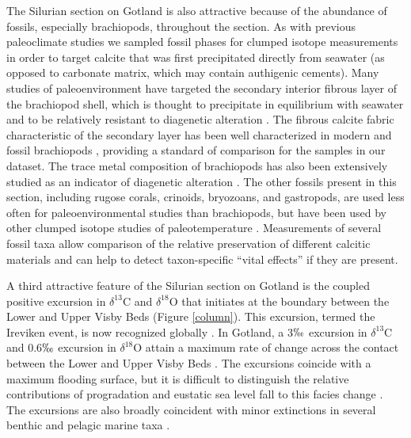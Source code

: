 \documentclass[5p, authoryear]{elsarticle}
\begin{document}
The Silurian section on Gotland is also attractive because of the abundance of fossils, especially brachiopods, throughout the section. As with previous paleoclimate studies we sampled fossil phases for clumped isotope measurements in order to target calcite that was first precipitated directly from seawater (as opposed to carbonate matrix, which may contain authigenic cements). Many studies of paleoenvironment have targeted the secondary interior fibrous layer of the brachiopod shell, which is thought to precipitate in equilibrium with seawater and to be relatively resistant to diagenetic alteration \citep{Azmy1998, Samtleben2001}. The fibrous calcite fabric characteristic of the secondary layer has been well characterized in modern and fossil brachiopods \citep{PerezHuerta2007, Samtleben2001, Schmahl2004}, providing a standard of comparison for the samples in our dataset. The trace metal composition of brachiopods has also been extensively studied as an indicator of diagenetic alteration \citep{Azmy1998, Brand2003, Brand2012, Mii1994, Grossman1996, Shields2003}. The other fossils present in this section, including rugose corals, crinoids, bryozoans, and gastropods, are used less often for paleoenvironmental studies than brachiopods, but have been used by other clumped isotope studies of paleotemperature \citep{Came2007, Dennis2013, Finnegan2011}. Measurements of several fossil taxa allow comparison of the relative preservation of different calcitic materials and can help to detect taxon-specific ``vital effects'' if they are present. 

A third attractive feature of the Silurian section on Gotland is the coupled positive excursion in $\delta^{13}$C and $\delta^{18}$O that initiates at the boundary between the Lower and Upper Visby Beds (Figure \ref{column}). This excursion, termed the Ireviken event, is now recognized globally \citep{Munnecke2003}. In Gotland, a 3$\permil$ excursion in $\delta^{13}$C and 0.6$\permil$ excursion in $\delta^{18}$O attain a maximum rate of change across the contact between the Lower and Upper Visby Beds \citep{Munnecke2003}. The excursions coincide with a maximum flooding surface, but it is difficult to distinguish the relative contributions of progradation and eustatic sea level fall to this facies change \citep{Calner2004a}. The excursions are also broadly coincident with minor extinctions in several benthic and pelagic marine taxa \citep{Munnecke2003}. 
\end{document}

